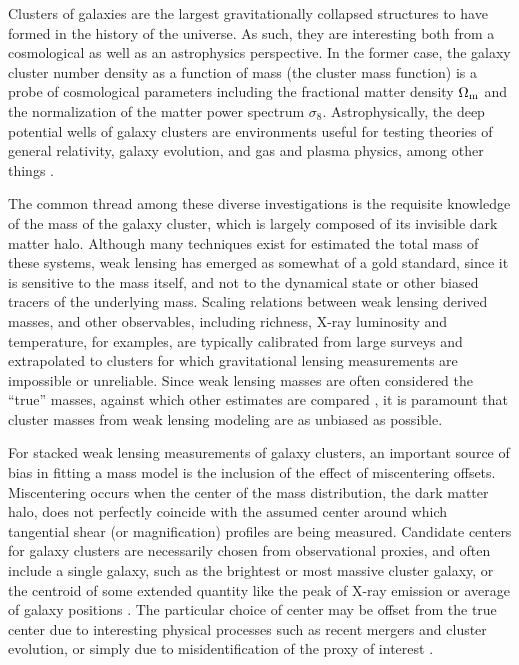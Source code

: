 \documentclass[twocolumn]{aastex6}
\begin{document}
Clusters of galaxies are the largest gravitationally collapsed structures to have formed in the history of the universe.  As such, they are interesting both from a cosmological as well as an astrophysics perspective. In the former case, the galaxy cluster number density as a function of mass (the cluster mass function) is a probe of cosmological parameters including the fractional matter density $\Omega_{\rm m}$ and the normalization of the matter power spectrum $\sigma_8$. Astrophysically, the deep potential wells of galaxy clusters are environments useful for testing theories of general relativity, galaxy evolution, and gas and plasma physics, among other things \citep{Voit05}. 

The common thread among these diverse investigations is the requisite knowledge of the mass of the galaxy cluster, which is largely composed of its invisible dark matter halo. Although many techniques exist for estimated the total mass of these systems, weak lensing has emerged as somewhat of a gold standard, since it is sensitive to the mass itself, and not to the dynamical state or other biased tracers of the underlying mass. Scaling relations between weak lensing derived masses, and other observables, including richness, X-ray luminosity and temperature, for examples, are typically calibrated from large surveys and extrapolated to clusters for which gravitational lensing measurements are impossible or unreliable. Since weak lensing masses are often considered the ``true'' masses, against which other estimates are compared \citep[e.g.][]{Leauthaud10, vonderLinden14, Hoekstra15}, it is paramount that cluster masses from weak lensing modeling are as unbiased as possible.

For stacked weak lensing measurements of galaxy clusters, an important source of bias in fitting a mass model is the inclusion of the effect of miscentering offsets. Miscentering occurs when the center of the mass distribution, the dark matter halo, does not perfectly coincide with the assumed center around which tangential shear (or magnification) profiles are being measured. Candidate centers for galaxy clusters are necessarily chosen from observational proxies, and often include a single galaxy, such as the brightest or most massive cluster galaxy, or the centroid of some extended quantity like the peak of X-ray emission or average of galaxy positions \citep{George12}. The particular choice of center may be offset from the true center due to interesting physical processes such as recent mergers and cluster evolution, or simply due to misidentification of the proxy of interest \citep{Johnston07}. 
\end{document}
